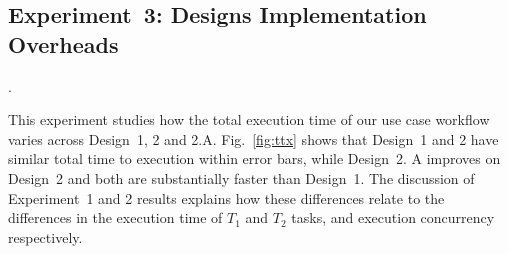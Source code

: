 \subsection{Experiment~3: Designs Implementation Overheads}
\label{ssec:exp3}.

This experiment studies how the total execution time of our use case workflow
varies across Design~1, 2 and 2.A. Fig.~\ref{fig:ttx} shows that Design~1
and 2 have similar total time to execution within error bars, while Design~2.
A improves on Design~2 and both are substantially faster than Design~1. The
discussion of Experiment~1 and 2 results explains how these differences relate
to the differences in the execution time of $T_{1}$ and $T_{2}$ tasks, and
execution concurrency respectively.

